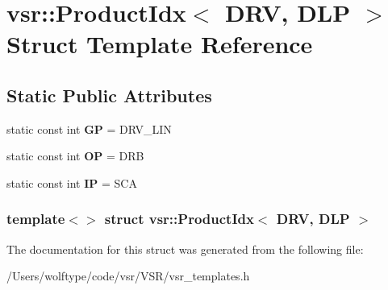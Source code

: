 \hypertarget{structvsr_1_1_product_idx_3_01_d_r_v_00_01_d_l_p_01_4}{\section{vsr\-:\-:Product\-Idx$<$ D\-R\-V, D\-L\-P $>$ Struct Template Reference}
\label{structvsr_1_1_product_idx_3_01_d_r_v_00_01_d_l_p_01_4}
}
\subsection*{Static Public Attributes}
\begin{DoxyCompactItemize}
\item 
\hypertarget{structvsr_1_1_product_idx_3_01_d_r_v_00_01_d_l_p_01_4_abf57820cee14ba953ad0a9977f5c3482}{static const int {\bfseries G\-P} = D\-R\-V\-\_\-\-L\-I\-N}\label{structvsr_1_1_product_idx_3_01_d_r_v_00_01_d_l_p_01_4_abf57820cee14ba953ad0a9977f5c3482}

\item 
\hypertarget{structvsr_1_1_product_idx_3_01_d_r_v_00_01_d_l_p_01_4_abe41660e3daf74a265a3f08d1cff7848}{static const int {\bfseries O\-P} = D\-R\-B}\label{structvsr_1_1_product_idx_3_01_d_r_v_00_01_d_l_p_01_4_abe41660e3daf74a265a3f08d1cff7848}

\item 
\hypertarget{structvsr_1_1_product_idx_3_01_d_r_v_00_01_d_l_p_01_4_a9c4da131741e99699d4f5eec923296ed}{static const int {\bfseries I\-P} = S\-C\-A}\label{structvsr_1_1_product_idx_3_01_d_r_v_00_01_d_l_p_01_4_a9c4da131741e99699d4f5eec923296ed}

\end{DoxyCompactItemize}
\subsubsection*{template$<$$>$ struct vsr\-::\-Product\-Idx$<$ D\-R\-V, D\-L\-P $>$}



The documentation for this struct was generated from the following file\-:\begin{DoxyCompactItemize}
\item 
/\-Users/wolftype/code/vsr/\-V\-S\-R/vsr\-\_\-templates.\-h\end{DoxyCompactItemize}
